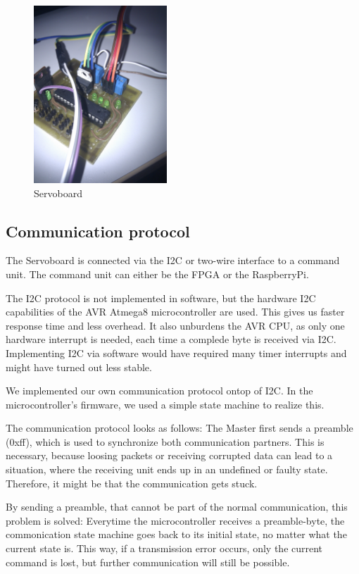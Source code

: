 \documentclass[12pt]{article}
\begin{document}
\begin{figure}[h]
\begin{center}
\includegraphics[width=5cm]{pic/servoboardr.jpg}
\caption{Servoboard}
\end{center}
\label{figservoboardr}
\end{figure}

\subsection{Communication protocol}
The Servoboard is connected via the I2C or two-wire interface to a command unit.
The command unit can either be the FPGA or the RaspberryPi.


The I2C protocol is not implemented in software, but the hardware I2C capabilities of the AVR Atmega8 microcontroller are used.
This gives us faster response time and less overhead.
It also unburdens the AVR CPU, as only one hardware interrupt is needed, each time a complede byte is received via I2C.
Implementing I2C via software would have required many timer interrupts and might have turned out less stable.


We implemented our own communication protocol ontop of I2C.
In the microcontroller's firmware, we used a simple state machine to realize this.

The communication protocol looks as follows:
The Master first sends a preamble (0xff), which is used to synchronize both communication partners.
This is necessary, because loosing packets or receiving corrupted data can lead to a situation, where the receiving unit ends up in an undefined or faulty state.
Therefore, it might be that the communication gets stuck.

By sending a preamble, that cannot be part of the normal communication, this problem is solved: Everytime the microcontroller receives a preamble-byte, the commonication state machine goes back to its initial state, no matter what the current state is.
This way, if a transmission error occurs, only the current command is lost, but further communication will still be possible.
\end{document}

